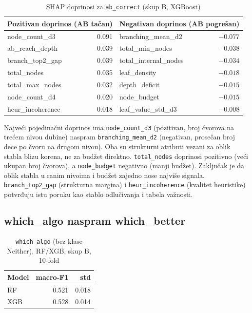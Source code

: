 \documentclass[12pt, a4paper]{article}
\begin{document}
\begin{table}[H]
\centering
\caption{SHAP doprinosi za \texttt{ab\_correct} (skup B, XGBoost)}
\begin{tabular}{lr@{\hspace{3em}}lr}
\toprule
\multicolumn{2}{c}{\textbf{Pozitivan doprinos (AB tačan)}} & \multicolumn{2}{c}{\textbf{Negativan doprinos (AB pogrešan)}} \\
\midrule
node\_count\_d3         &  0.091 & branching\_mean\_d2   & $-0.077$ \\
ab\_reach\_depth        &  0.039 & total\_min\_nodes     & $-0.038$ \\
branch\_top2\_gap       &  0.039 & total\_internal\_nodes & $-0.034$ \\
total\_nodes            &  0.035 & leaf\_density         & $-0.018$ \\
total\_max\_nodes       &  0.032 & depth\_deficit        & $-0.015$ \\
node\_count\_d4         &  0.020 & node\_budget          & $-0.015$ \\
heur\_incoherence       &  0.018 & leaf\_value\_std\_d3  & $-0.008$ \\
\bottomrule
\end{tabular}
\end{table}

Najveći pojedinačni doprinos ima \texttt{node\_count\_d3} (pozitivan, broj čvorova na trećem
nivou dubine) naspram \texttt{branching\_mean\_d2} (negativan, prosečan broj dece po čvoru na
drugom nivou). Oba su strukturni atributi vezani za oblik stabla blizu korena, ne za budžet
direktno. \texttt{total\_nodes} doprinosi pozitivno (veći ukupan broj čvorova), a
\texttt{node\_budget} negativno (manji budžet). Zaključak je da oblik stabla u
ranim nivoima i budžet zajedno nose najviše signala.
\texttt{branch\_top2\_gap} (strukturna margina) i \texttt{heur\_incoherence} (kvalitet
heuristike) potvrđuju istu poruku kao stablo odlučivanja i tabela važnosti.

\subsection{which\_algo naspram which\_better}

\begin{table}[H]
\centering
\caption{\texttt{which\_algo} (bez klase Neither), RF/XGB, skup B, 10-fold}
\begin{tabular}{lrr}
\toprule
\textbf{Model} & \textbf{macro-F1} & \textbf{std} \\
\midrule
RF  & 0.521 & 0.018 \\
XGB & 0.528 & 0.014 \\
\bottomrule
\end{tabular}
\end{table}
\end{document}
